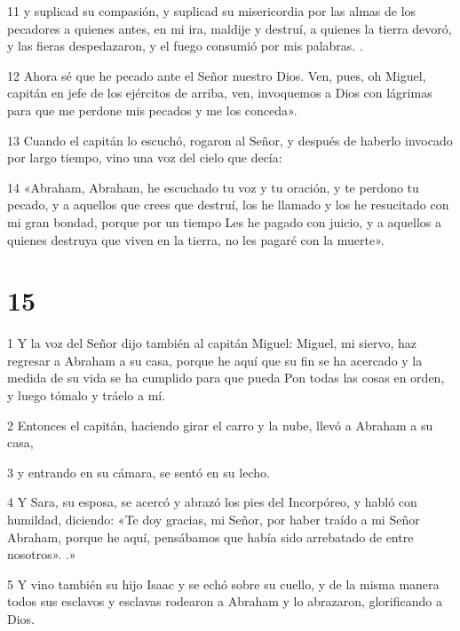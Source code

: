 \par 11 y suplicad su compasión, y suplicad su misericordia por las almas de los pecadores a quienes antes, en mi ira, maldije y destruí, a quienes la tierra devoró, y las fieras despedazaron, y el fuego consumió por mis palabras. .

\par 12 Ahora sé que he pecado ante el Señor nuestro Dios. Ven, pues, oh Miguel, capitán en jefe de los ejércitos de arriba, ven, invoquemos a Dios con lágrimas para que me perdone mis pecados y me los conceda».

\par 13 Cuando el capitán lo escuchó, rogaron al Señor, y después de haberlo invocado por largo tiempo, vino una voz del cielo que decía:

\par 14 «Abraham, Abraham, he escuchado tu voz y tu oración, y te perdono tu pecado, y a aquellos que crees que destruí, los he llamado y los he resucitado con mi gran bondad, porque por un tiempo Les he pagado con juicio, y a aquellos a quienes destruya que viven en la tierra, no les pagaré con la muerte».

\chapter{15}

\par 1 Y la voz del Señor dijo también al capitán Miguel: Miguel, mi siervo, haz regresar a Abraham a su casa, porque he aquí que su fin se ha acercado y la medida de su vida se ha cumplido para que pueda Pon todas las cosas en orden, y luego tómalo y tráelo a mí.

\par 2 Entonces el capitán, haciendo girar el carro y la nube, llevó a Abraham a su casa,

\par 3 y entrando en su cámara, se sentó en su lecho.

\par 4 Y Sara, su esposa, se acercó y abrazó los pies del Incorpóreo, y habló con humildad, diciendo: «Te doy gracias, mi Señor, por haber traído a mi Señor Abraham, porque he aquí, pensábamos que había sido arrebatado de entre nosotros». .»

\par 5 Y vino también su hijo Isaac y se echó sobre su cuello, y de la misma manera todos sus esclavos y esclavas rodearon a Abraham y lo abrazaron, glorificando a Dios.

